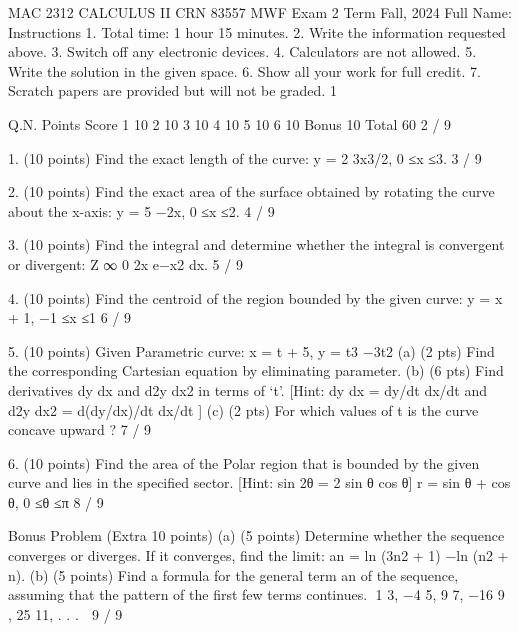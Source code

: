 MAC 2312 CALCULUS II CRN 83557 MWF
Exam 2
Term Fall, 2024
Full Name:
Instructions
1. Total time: 1 hour 15 minutes.
2. Write the information requested above.
3. Switch off any electronic devices.
4. Calculators are not allowed.
5. Write the solution in the given space.
6. Show all your work for full credit.
7. Scratch papers are provided but will not be graded.
1

Q.N.
Points
Score
1
10
2
10
3
10
4
10
5
10
6
10
Bonus
10
Total
60
2 / 9

1. (10 points) Find the exact length of the curve:
y = 2
3x3/2,
0 ≤x ≤3.
3 / 9

2. (10 points) Find the exact area of the surface obtained by rotating the curve about the x-axis:
y = 5 −2x,
0 ≤x ≤2.
4 / 9

3. (10 points) Find the integral and determine whether the integral is convergent or divergent:
Z ∞
0
2x e−x2 dx.
5 / 9

4. (10 points) Find the centroid of the region bounded by the given curve:
y = x + 1, −1 ≤x ≤1
6 / 9

5. (10 points) Given Parametric curve: x = t + 5,
y = t3 −3t2
(a) (2 pts) Find the corresponding Cartesian equation by eliminating parameter.
(b) (6 pts) Find derivatives dy
dx and d2y
dx2 in terms of ‘t’.
[Hint: dy
dx = dy/dt
dx/dt and d2y
dx2 = d(dy/dx)/dt
dx/dt
]
(c) (2 pts) For which values of t is the curve concave upward ?
7 / 9

6. (10 points) Find the area of the Polar region that is bounded by the given curve and lies in the specified
sector. [Hint: sin 2θ = 2 sin θ cos θ]
r = sin θ + cos θ,
0 ≤θ ≤π
8 / 9

Bonus Problem (Extra 10 points)
(a) (5 points) Determine whether the sequence converges or diverges. If it converges, find the limit:
an = ln (3n2 + 1) −ln (n2 + n).
(b) (5 points) Find a formula for the general term an of the sequence, assuming that the pattern of the
first few terms continues.
1
3, −4
5, 9
7, −16
9 , 25
11, . . .

9 / 9

